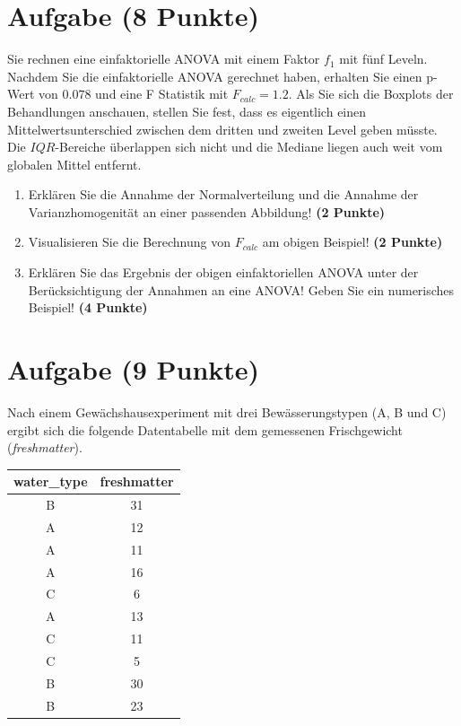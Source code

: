 \documentclass[a4paper, 10pt]{scrartcl}\usepackage[]{graphicx}\usepackage[]{color}
\begin{document}
 
\clearpage

\section{Aufgabe \hfill (8 Punkte)}



Sie rechnen eine einfaktorielle ANOVA mit einem Faktor $f_1$ mit fünf Leveln. Nachdem Sie die einfaktorielle ANOVA gerechnet haben, erhalten Sie einen p-Wert von $0.078$ und eine F Statistik mit $F_{calc} = 1.2$. Als Sie sich die Boxplots der Behandlungen anschauen, stellen Sie fest, dass es eigentlich einen Mittelwertsunterschied zwischen dem dritten und zweiten Level geben müsste. Die $IQR$-Bereiche überlappen sich nicht und die Mediane liegen auch weit vom globalen Mittel entfernt.


\begin{enumerate}
\item Erklären Sie die Annahme der Normalverteilung und die Annahme der Varianzhomogenität an einer passenden Abbildung! \textbf{(2 Punkte)}
\item Visualisieren Sie die Berechnung von $F_{calc}$ am obigen Beispiel! \textbf{(2 Punkte)}
\item Erklären Sie das Ergebnis der obigen einfaktoriellen ANOVA unter der Berücksichtigung der Annahmen an eine ANOVA! Geben Sie ein numerisches Beispiel! \textbf{(4 Punkte)}
\end{enumerate}

 
\clearpage

\section{Aufgabe \hfill (9 Punkte)}

Nach einem Gew{\"a}chshausexperiment mit drei Bew{\"a}sserungstypen (A, B und C) ergibt sich die
folgende Datentabelle mit dem gemessenen Frischgewicht (\textit{freshmatter}). 

\begin{table}[!h]
\centering
\begin{tabular}{cc}
\toprule
water\_type & freshmatter\\
\midrule
B & 31\\
A & 12\\
A & 11\\
A & 16\\
C & 6\\
\addlinespace
A & 13\\
C & 11\\
C & 5\\
B & 30\\
B & 23\\
\bottomrule
\end{tabular}
\end{table}
\end{document}
